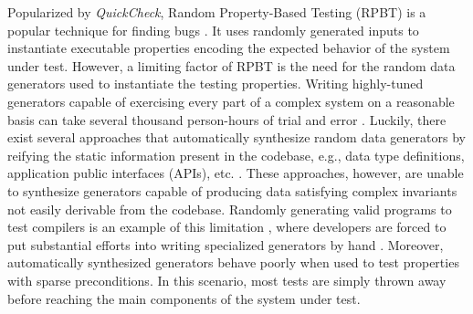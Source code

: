 \documentclass[sigconf,review,anonymous]{acmart}
\newcommand{\quickcheck}{\textit{QuickCheck}\xspace}
\begin{document}
%
Popularized by \quickcheck \cite{ClaessenH00}, Random Property-Based Testing
(RPBT) is a popular technique for finding bugs
\cite{ClaessenH00,hughes2003erlang, papadakis2011proper, bulwahn2012new,
  denes2014quickchick}.
%
It uses randomly generated inputs to instantiate executable properties encoding
the expected behavior of the system under test.
%
%
%
However, a limiting factor of RPBT is the need for the random data generators
used to instantiate the testing properties. 
%
Writing highly-tuned generators capable of exercising every part of a complex
system on a reasonable basis can take several thousand person-hours of trial and
error \cite{lampropoulos2019coverage}.
%
Luckily, there exist several approaches that automatically synthesize random
data generators by reifying the static information present in the codebase,
e.g., data type definitions, application public interfaces (APIs), etc.
\cite{GriecoCB16, DBLP:conf/haskell/MistaRH18, Mista2019GeneratingRS,
DuregardJW12, Lampropoulos2017, Bendkowski2017}.
%
These approaches, however, are unable to synthesize generators capable of
producing data satisfying complex invariants not easily derivable from the
codebase.
%
Randomly generating valid programs to test compilers is an example of this
limitation \cite{chen2020asurvey}, where developers are forced to put
substantial efforts into writing specialized generators by hand \cite{Palka11,
perenyi2020stack, yang2011finding}.
%
Moreover, automatically synthesized generators behave poorly when used to test
properties with sparse preconditions.
%
In this scenario, most tests are simply thrown away before reaching the main
components of the system under test.
\end{document}
